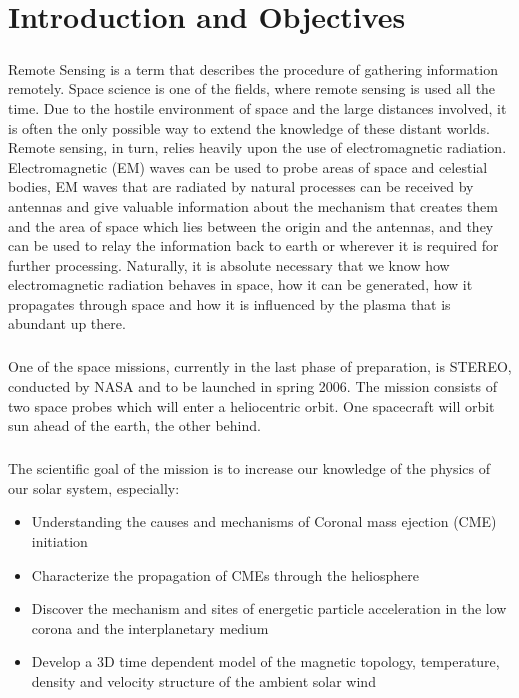 \documentclass[a4paper,10pt]{thesis}
\begin{document}
\chapter{\textbf{Introduction and Objectives}}

\paragraph*{}
Remote Sensing is a term that describes the procedure of gathering information remotely. Space science is one of the fields, where remote sensing is used all the time. Due to the hostile environment of space and the large distances involved, it is often the only possible way to extend the knowledge of these distant worlds. Remote sensing, in turn, relies heavily upon the use of electromagnetic radiation. Electromagnetic (EM) waves can be used to probe areas of space and celestial bodies, EM waves that are radiated by natural processes can be received by antennas and give valuable information about the mechanism that creates them and the area of space which lies between the origin and the antennas, and they can be used to relay the information back to earth or wherever it is required for further processing. Naturally, it is absolute necessary that we know how electromagnetic radiation behaves in space, how it can be generated, how it propagates through space and how it is influenced by the plasma that is abundant up there.

\paragraph*{}
One of the space missions, currently in the last phase of preparation, is STEREO, conducted by NASA and to be launched in spring 2006. The mission consists of two space probes which will enter a heliocentric orbit. One spacecraft will orbit sun ahead of the earth, the other behind.

\paragraph*{}
The scientific goal of the mission is to increase our knowledge of the physics of our solar system, especially:

\begin{itemize}
\item Understanding the causes and mechanisms of Coronal mass ejection (CME) initiation
\item Characterize the propagation of CMEs through the heliosphere
\item Discover the mechanism and sites of energetic particle acceleration in the low corona and the interplanetary medium
\item Develop a 3D time dependent model of the magnetic topology, temperature, density and velocity structure of the ambient solar wind
\end{itemize}
\end{document}
